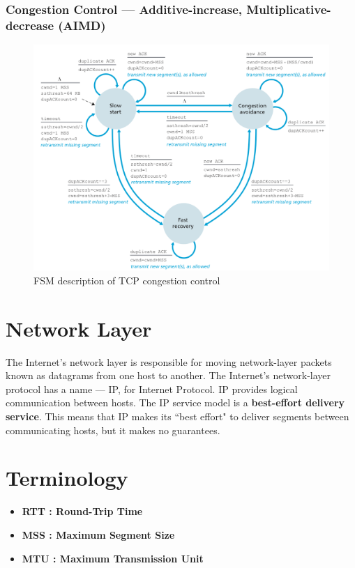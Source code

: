 \documentclass[11pt]{article}
\begin{document}
\subsubsection{Congestion Control --- Additive-increase, Multiplicative-decrease (AIMD)}

\begin{figure}[h]
	\centering
	\includegraphics[width=0.9\linewidth]{images/CongestionControl.png}
	\caption{FSM description of TCP congestion control}
	\label{fig:CongestionControl}
\end{figure}






\newpage
\section{Network Layer}

The Internet’s network layer is responsible for moving network-layer packets known as datagrams from one host to another. The Internet’s network-layer protocol has a name --- IP, for Internet Protocol. IP provides logical communication between hosts. The IP service model is a \textbf{best-effort delivery service}. This means that IP makes its ``best effort" to deliver segments between communicating hosts, but it makes no guarantees.


\section{Terminology}

\begin{itemize}

	\item \textbf{RTT : Round-Trip Time}
	
	\item \textbf{MSS : Maximum Segment Size}
	
	\item \textbf{MTU : Maximum Transmission Unit}

\end{itemize}
\end{document}
